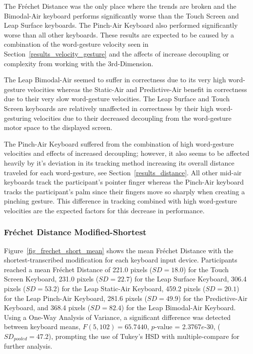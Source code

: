 The Fr\'echet Distance was the only place where the trends are broken and the Bimodal-Air keyboard performs significantly worse than the Touch Screen and Leap Surface keyboards. The Pinch-Air Keyboard also performed significantly worse than all other keyboards. These results are expected to be caused by a combination of the word-gesture velocity seen in Section~\ref{results_velocity_gesture} and the affects of increase decoupling or complexity from working with the 3rd-Dimension.

The Leap Bimodal-Air seemed to suffer in correctness due to its very high word-gesture velocities whereas the Static-Air and Predictive-Air benefit in correctness due to their very slow word-gesture velocities. The Leap Surface and Touch Screen keyboards are relatively unaffected in correctness by their high word-gesturing velocities due to their decreased decoupling from the word-gesture motor space to the displayed screen. 

The Pinch-Air Keyboard suffered from the combination of high word-gesture velocities and effects of increased decoupling; however, it also seems to be affected heavily by it's deviation in its tracking method increasing its overall distance traveled for each word-gesture, see Section~\ref{results_distance}. All other mid-air keyboards track the participant's pointer finger whereas the Pinch-Air keyboard tracks the participant's palm since their fingers move so sharply when creating a pinching gesture. This difference in tracking combined with high word-gesture velocities are the expected factors for this decrease in performance.

\subsubsection{Fr\'echet Distance Modified-Shortest}
Figure~\ref{fig_frechet_short_mean} shows the mean Fr\'echet Distance with the shortest-transcribed modification for each keyboard input device. Participants reached a mean Fr\'echet Distance of 221.0 pixels ($SD = 18.0$) for the Touch Screen Keyboard, 231.0 pixels ($SD = 22.7$) for the Leap Surface Keyboard, 306.4 pixels ($SD = 53.2$) for the Leap Static-Air Keyboard, 459.2 pixels ($SD = 20.1$) for the Leap Pinch-Air Keyboard, 281.6 pixels ($SD = 49.9$) for the Predictive-Air Keyboard, and 368.4 pixels ($SD = 82.4$) for the Leap Bimodal-Air Keyboard. Using a One-Way Analysis of Variance, a significant difference was detected between keyboard means, $F(5, 102) = 65.7440$, $p$-value = 2.3767$e$-30, ($SD_{pooled} = 47.2$), prompting the use of Tukey's HSD with multiple-compare for further analysis.

